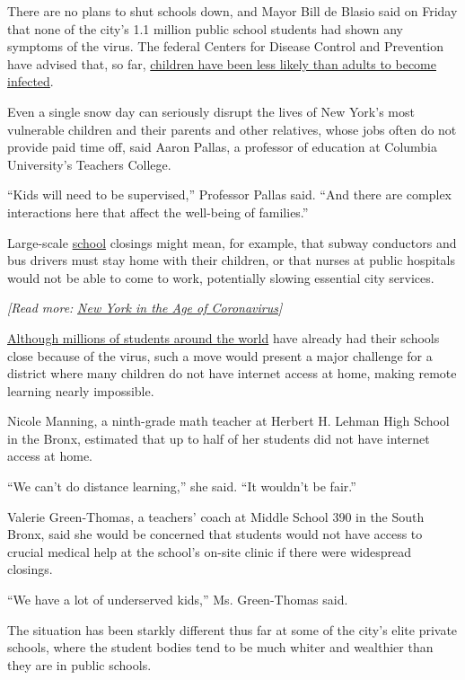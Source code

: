 There are no plans to shut schools down, and Mayor Bill de Blasio said
on Friday that none of the city's 1.1 million public school students had
shown any symptoms of the virus. The federal Centers for Disease Control
and Prevention have advised that, so far,
\href{https://www.cdc.gov/coronavirus/2019-ncov/specific-groups/children-faq.html}{children
have been less likely than adults to become infected}.

Even a single snow day can seriously disrupt the lives of New York's
most vulnerable children and their parents and other relatives, whose
jobs often do not provide paid time off, said Aaron Pallas, a professor
of education at Columbia University's Teachers College.

``Kids will need to be supervised,'' Professor Pallas said. ``And there
are complex interactions here that affect the well-being of families.''

Large-scale
\href{https://www.nytimes.com/2020/04/16/nyregion/special-education-coronavirus-nyc.html}{school}
closings might mean, for example, that subway conductors and bus drivers
must stay home with their children, or that nurses at public hospitals
would not be able to come to work, potentially slowing essential city
services.

\emph{{[}Read more:}
\href{https://www.nytimes.com/2020/03/08/nyregion/coronavirus-nyc.html}{\emph{New
York in the Age of Coronavirus}}\emph{{]}}

\href{https://www.nytimes.com/2020/03/04/world/coronavirus-schools-closed.html}{Although
millions of students around the world} have already had their schools
close because of the virus, such a move would present a major challenge
for a district where many children do not have internet access at home,
making remote learning nearly impossible.

Nicole Manning, a ninth-grade math teacher at Herbert H. Lehman High
School in the Bronx, estimated that up to half of her students did not
have internet access at home.

``We can't do distance learning,'' she said. ``It wouldn't be fair.''

Valerie Green-Thomas, a teachers' coach at Middle School 390 in the
South Bronx, said she would be concerned that students would not have
access to crucial medical help at the school's on-site clinic if there
were widespread closings.

``We have a lot of underserved kids,'' Ms. Green-Thomas said.

The situation has been starkly different thus far at some of the city's
elite private schools, where the student bodies tend to be much whiter
and wealthier than they are in public schools.

